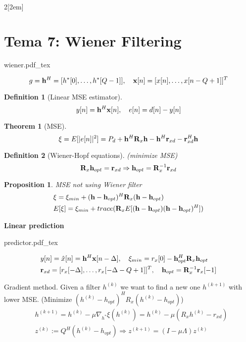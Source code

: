 \documentclass[leqno]{article}
\newtheorem*{definition}{Definition}
\newtheorem*{theorem}{Theorem}
\newtheorem*{proposition}{Proposition}
\newcommand{\incfig}[1]{%
{\center
\def\svgwidth{0.9\columnwidth}
{#1.pdf_tex}
\par}
}
\begin{document}
\begin{multicols}{2}[\columnsep2em]
\section{Tema 7: Wiener Filtering}
\incfig{wiener}
\[
g = \vb{h}^H = [h^*[0], \ldots, h^*[Q-1]], \quad \vb{x}[n] = [x[n], \ldots, x[n-Q+1]]^T
\] 

\begin{definition}[Linear MSE estimator] 
\[
y[n]=\vb{h}^H\vb{x}[n], \quad e[n] = d[n]-y[n]
\] 
\end{definition}

\begin{theorem}[MSE]
 \[
\xi = E[|e[n]|^2] = P_d + \vb{h}^H\vb{R}_x\vb{h} - \vb{h}^H\vb{r}_{xd} -\vb{r}_{xd}^H\vb{h}
\] 
\end{theorem}

\begin{definition}[Wiener-Hopf equations](minimize MSE)
\[
\vb{R}_x\vb{h}_{opt}= \vb{r}_{xd} \Rightarrow \vb{h}_{opt}=\vb{R}_x ^{-1}\vb{r}_{xd}
\] 
\end{definition}

\begin{proposition}MSE not using Wiener filter 
\begin{align*}
&\xi = \xi _{min} + (\vb{h}-\vb{h}_{opt})^H\vb{R}_x(\vb{h}-\vb{h}_{opt}) \\
&E[\xi ]= \xi_{min} + trace(\vb{R}_xE[(\vb{h}-\vb{h}_{opt})(\vb{h}-\vb{h}_{opt})^H])
\end{align*}
\end{proposition}


\textbf{Linear prediction}
\incfig{predictor}

\begin{align*}
  & y[n] = \hat{x}[n] = \vb{h}^H\vb{x}[n-\Delta], \quad \xi _{min} = r_x[0]-\vb{h}_{opt}^H\vb{R}_x\vb{h}_{opt} \\
  & \vb{r}_{xd}=[r_x[-\Delta ], \ldots, r_x[-\Delta -Q+1]]^T,\quad \vb{h}_{opt} = \vb{R}_x ^{-1}\vb{r}_{x}[-1]
\end{align*}

Gradient method. Given a filter $h^{(k)}$ we want to find a new one $h^{(k+1)}$ with lower MSE. (Minimize $(h^{(k)}-h_{opt})^HR_x(h^{(k)}-h_{opt})$)
\begin{align*}
  & h^{(k+1)} = h^{(k)} - \mu \nabla_{h^*}\xi (h^{(k)}) = h^{(k)} - \mu(R_xh^{(k)} - r_{xd}) \\
  & z^{(k)} := Q^H(h^{(k)}-h_{opt}) \Rightarrow z^{(k+1)} = (I-\mu \Lambda)z^{(k)}
\end{align*}


\end{multicols}
\end{document}
